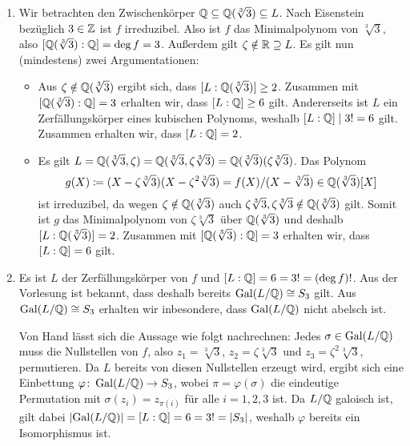\begin{solution}
\begin{enumerate}
    \item
      Wir betrachten den Zwischenkörper $\mathbb{Q} \subseteq \mathbb{Q}(\sqrt[3]{3}) \subseteq L$.
      Nach Eisenstein bezüglich $3 \in \mathbb{Z}$ ist $f$ irreduzibel.
      Also ist $f$ das Minimalpolynom von $\sqrt[3]{3}$, also $[\mathbb{Q}(\sqrt[3]{3}) : \mathbb{Q}] = \deg f = 3$.
      Außerdem gilt $\zeta \notin \mathbb{R} \supseteq L$.
      Es gilt nun (mindestens) zwei Argumentationen:
      \begin{itemize}
        \item
          Aus $\zeta \notin \mathbb{Q}(\sqrt[3]{3})$ ergibt sich, dass $[L : \mathbb{Q}(\sqrt[3]{3})] \geq 2$.
          Zusammen mit $[\mathbb{Q}(\sqrt[3]{3}) : \mathbb{Q}] = 3$ erhalten wir, dass $[L : \mathbb{Q}] \geq 6$ gilt.
          Andererseits ist $L$ ein Zerfällungskörper eines kubischen Polynoms, weshalb $[L : \mathbb{Q}] \mid 3! = 6$ gilt.
          Zusammen erhalten wir, dass $[L : \mathbb{Q}] = 2$.
        \item
          Es gilt $L = \mathbb{Q}(\sqrt[3]{3}, \zeta) = \mathbb{Q}(\sqrt[3]{3}, \zeta \sqrt[3]{3}) = \mathbb{Q}(\sqrt[3]{3})(\zeta \sqrt[3]{3})$.
          Das Polynom
          \[
                      g(X)
            \coloneqq (X - \zeta \sqrt[3]{3})(X - \zeta^2 \sqrt[3]{3})
            =         f(X)/(X-\sqrt[3]{3})
            \in       \mathbb{Q}(\sqrt[3]{3})[X]
          \]
          ist irreduzibel, da wegen $\zeta \notin \mathbb{Q}(\sqrt[3]{3})$ auch $\zeta \sqrt[3]{3}, \zeta \sqrt[3]{3} \notin \mathbb{Q}(\sqrt[3]{3})$ gilt.
          Somit ist $g$ das Minimalpolynom von $\zeta \sqrt[3]{3}$ über $\mathbb{Q}(\sqrt[3]{3})$ und deshalb $[L : \mathbb{Q}(\sqrt[3]{3})] = 2$.
          Zusammen mit $[\mathbb{Q}(\sqrt[3]{3}) : \mathbb{Q}] = 3$ erhalten wir, dass $[L : \mathbb{Q}] = 6$ gilt.
      \end{itemize}
          
    \item
      Es ist $L$ der Zerfällungskörper von $f$ und $[L : \mathbb{Q}] = 6 = 3! = (\deg f)!$.
      Aus der Vorlesung ist bekannt, dass deshalb bereits $\operatorname{Gal}(L/\mathbb{Q}) \cong S_3$ gilt.
      Aus $\operatorname{Gal}(L/\mathbb{Q}) \cong S_3$ erhalten wir inbesondere, dass $\operatorname{Gal}(L/\mathbb{Q})$ nicht abelsch ist.
      
      Von Hand lässt sich die Aussage wie folgt nachrechnen:
      Jedes $\sigma \in \operatorname{Gal}(L/\mathbb{Q})$ muss die Nullstellen von $f$, also $z_1 = \sqrt[3]{3}$, $z_2 = \zeta \sqrt[3]{3}$ und $z_3 = \zeta^2 \sqrt[3]{3}$, permutieren.
      Da $L$ bereits von diesen Nullstellen erzeugt wird, ergibt sich eine Einbettung $\varphi \colon \operatorname{Gal}(L/\mathbb{Q}) \to S_3$, wobei $\pi = \varphi(\sigma)$ die eindeutige Permutation mit $\sigma(z_i) = z_{\pi(i)}$ für alle $i = 1, 2, 3$ ist.
      Da $L/\mathbb{Q}$ galoisch ist, gilt dabei $|{\operatorname{Gal}(L/\mathbb{Q})}| = [L : \mathbb{Q}] = 6 = 3! = |S_3|$, weshalb $\varphi$ bereits ein Isomorphismus ist.
  \end{enumerate}
\end{solution}


